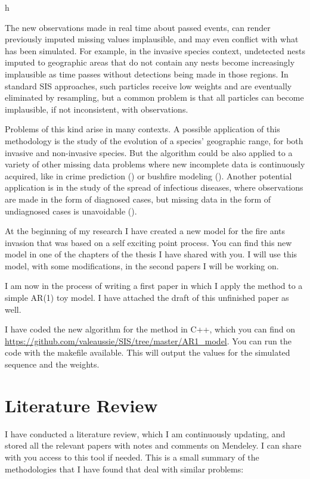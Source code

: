 h\documentclass[11pt,a4paper]{article}
\begin{document}
The new observations made in real time about passed events, can render previously imputed missing values implausible, and may even conflict with what has been simulated. For example, in the invasive species context, undetected nests imputed to geographic areas that do not contain any nests become increasingly implausible as time passes without detections being made in those regions. In standard SIS approaches, such particles receive low weights and are eventually eliminated by resampling, but a common problem is that all particles can become implausible, if not inconsistent, with observations.

Problems of this kind arise in many contexts. A possible application of this methodology is the study of the evolution of a species' geographic range, for both invasive and non-invasive species. But the algorithm could be also applied to a variety of other missing data problems where new incomplete data is continuously acquired, like in crime prediction (\cite{Malathy}) or bushfire modeling (\cite{Beer}). Another potential application is in the study of the spread of infectious diseases, where observations are made in the form of diagnosed cases, but missing data in the form of undiagnosed cases is unavoidable (\cite{O'Neill}). 

At the beginning of my research I have created a new model for the fire ants invasion that was based on a self exciting point process.
You can find this new model in one of the chapters of the thesis I have shared with you. I will use this model, with some modifications, in the second papers I will be working on.

I am now in the process of writing a first paper in which I apply the method to a simple AR(1) toy model.
I have attached the draft of this unfinished paper as well.

I have coded the new algorithm for the method in C++, which you can find on \url{https://github.com/valeaussie/SIS/tree/master/AR1_model}. You can run the code with the makefile available. This will output the values for the simulated sequence and the weights.

\section{Literature Review}

I have conducted a literature review, which I am continuously updating, and stored all the relevant papers with notes and comments on Mendeley. I can share with you access to this tool if needed. This is a small summary of the methodologies that I have found that deal with similar problems:
\end{document}
